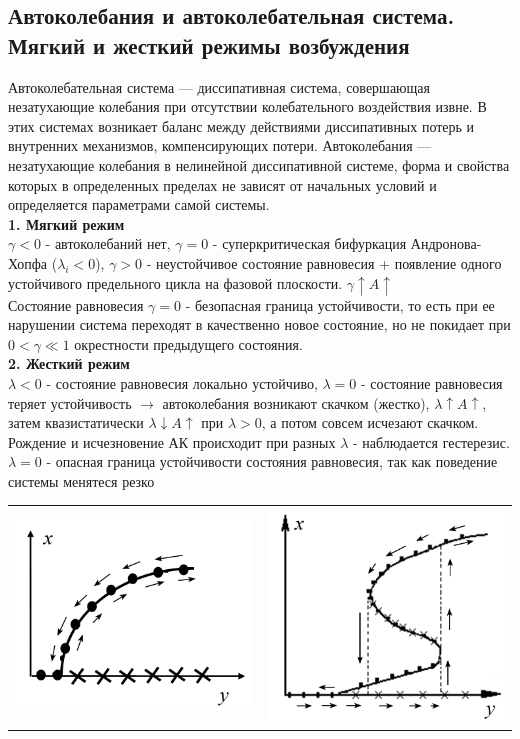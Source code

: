 \begin{multicols*}{2}
		
		\section{Автоколебания и автоколебательная система. Мягкий и жесткий режимы возбуждения}
		Автоколебательная система — диссипативная система, совершающая незатухающие колебания при отсутствии колебательного воздействия извне. В этих системах возникает баланс между действиями диссипативных потерь и внутренних механизмов, компенсирующих потери. Автоколебания — незатухающие колебания в нелинейной диссипативной системе, форма и свойства которых в определенных пределах не зависят от начальных условий и определяется параметрами самой системы.\\
		\textbf{1. Мягкий режим\\}
		$\gamma < 0$ - автоколебаний нет, $\gamma = 0$ - суперкритическая бифуркация Андронова-Хопфа ($\lambda_i < 0$), $\gamma > 0$ - неустойчивое состояние равновесия + появление одного устойчивого предельного цикла на фазовой плоскости. \quad $\gamma \uparrow A \uparrow$\\
		Состояние равновесия $\gamma = 0$ - безопасная граница устойчивости, то есть при ее нарушении система переходят в качественно новое состояние, но не покидает при $0<\gamma \ll 1$ окрестности предыдущего состояния.\\
		\textbf{2. Жесткий режим\\}
		$\lambda< 0$ - состояние равновесия локально устойчиво, $\lambda = 0$ - состояние равновесия теряет устойчивость $\rightarrow$ автоколебания возникают скачком (жестко), $\lambda \uparrow A \uparrow$, затем квазистатически $\lambda \downarrow A \uparrow$ при $\lambda > 0$, а потом совсем исчезают скачком. Рождение и исчезновение АК происходит при разных $\lambda$ - наблюдается гестерезис. $\lambda = 0$ - опасная граница устойчивости состояния равновесия, так как поведение системы менятеся резко\\
		\begin{tabular}{c c}
			\includegraphics[width=0.40\linewidth]{tk_img/avtokoleb_1.png} & \includegraphics[width=0.35\linewidth]{tk_img/avtokoleb_2.png}
		\end{tabular}\\
		

\end{multicols*}
